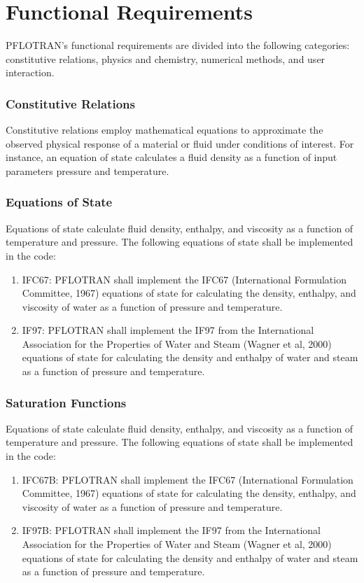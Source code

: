 \section{Functional Requirements}
PFLOTRAN’s functional requirements are divided into the following categories: constitutive relations, physics and chemistry, numerical methods, and user interaction.
\subsubsection{Constitutive Relations}
Constitutive relations employ mathematical equations to approximate the observed physical response of a material or fluid under conditions of interest. For instance, an equation of state calculates a fluid density as a function of input parameters pressure and temperature.
\subsubsection{Equations of State}
Equations of state calculate fluid density, enthalpy, and viscosity as a function of temperature and pressure. The following equations of state shall be implemented in the code:
\begin{enumerate}[label=EOS \arabic*.,ref=EOS \arabic*,nosep]
	\item IFC67: \label{ifc67} PFLOTRAN shall implement the IFC67 (International Formulation Committee, 1967) equations of state for calculating the density, enthalpy, and viscosity of water as a function of pressure and temperature.
	\item IF97: \label{if97} PFLOTRAN shall implement the IF97 from the International Association for the Properties of Water and Steam (Wagner et al, 2000) equations of state for calculating the density and enthalpy of water and steam as a function of pressure and temperature.
\end{enumerate}
\subsubsection{Saturation Functions}
Equations of state calculate fluid density, enthalpy, and viscosity as a function of temperature and pressure. The following equations of state shall be implemented in the code:
\begin{enumerate}[label=EOS \arabic*.,ref=EOS \arabic*,nosep,resume]
	\item IFC67B: \label{ifc67b} PFLOTRAN shall implement the IFC67 (International Formulation Committee, 1967) equations of state for calculating the density, enthalpy, and viscosity of water as a function of pressure and temperature.
	\item IF97B: \label{if97b} PFLOTRAN shall implement the IF97 from the International Association for the Properties of Water and Steam (Wagner et al, 2000) equations of state for calculating the density and enthalpy of water and steam as a function of pressure and temperature.
\end{enumerate}
